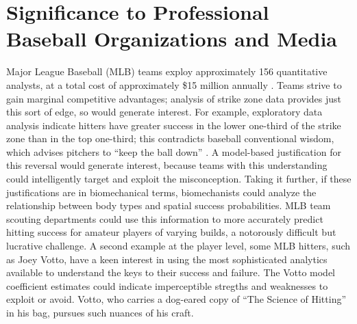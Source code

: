 \section{Significance to Professional Baseball Organizations and Media}

Major League Baseball (MLB\textsuperscript{\textregistered}) teams exploy approximately 156 quantitative analysts, at a total cost of approximately \$15 million annually \citep{Lindbergh2016}. Teams strive to gain marginal competitive advantages; analysis of strike zone data provides just this sort of edge, so would generate interest. For example, exploratory data analysis indicate hitters have greater success in the lower one-third of the strike zone than in the top one-third; this contradicts baseball conventional wisdom, which advises pitchers to ``keep the ball down'' \citep{Stallings2003}. A model-based justification for this reversal would generate interest, because teams with this understanding could intelligently target and exploit the misconception. Taking it further, if these justifications are in biomechanical terms, biomechanists could analyze the relationship between body types and spatial success probabilities. MLB\textsuperscript{\textregistered} team scouting departments could use this information to more accurately predict hitting success for amateur players of varying builds, a notorously difficult but lucrative challenge. A second example at the player level, some MLB\textsuperscript{\textregistered} hitters, such as Joey Votto, have a keen interest in using the most sophisticated analytics available to understand the keys to their success and failure\citep{Daugherty2015}. The Votto model coefficient estimates could indicate imperceptible stregths and weaknesses to exploit or avoid. Votto, who carries a dog-eared copy of ``The Science of Hitting'' in his bag, pursues such nuances of his craft. 

